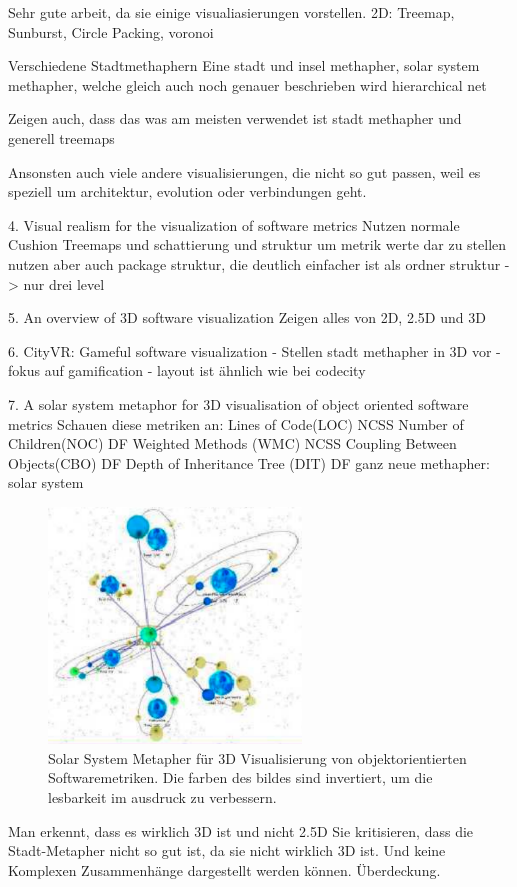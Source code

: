 Sehr gute arbeit, da sie einige visualiasierungen vorstellen.
2D: Treemap, Sunburst, Circle Packing, voronoi

Verschiedene Stadtmethaphern
Eine stadt und insel methapher,
solar system methapher, welche gleich auch noch genauer beschrieben wird
hierarchical net

Zeigen auch, dass das was am meisten verwendet ist stadt methapher und generell treemaps

Ansonsten auch viele andere visualisierungen, die nicht so gut passen, weil es speziell um architektur, evolution oder verbindungen geht.


4. Visual realism for the visualization of software metrics \cite{visRealism}
Nutzen normale Cushion Treemaps und schattierung und struktur um metrik werte dar zu stellen
nutzen aber auch package struktur, die deutlich einfacher ist als ordner struktur -> nur drei level

5. An overview of 3D software visualization \cite{overview3D}
Zeigen alles von 2D, 2.5D und 3D



6. CityVR: Gameful software visualization \cite{cityVR}
- Stellen stadt methapher in 3D vor
- fokus auf gamification
- layout ist ähnlich wie bei codecity

7. A solar system metaphor for 3D visualisation of object oriented software metrics \cite{solarSystem}
Schauen diese metriken an:
Lines of Code(LOC) NCSS
Number of Children(NOC) DF
Weighted Methods (WMC) NCSS
Coupling Between Objects(CBO) DF
Depth of Inheritance Tree (DIT) DF
ganz neue methapher: solar system

\begin{figure}
    \centering
    \includegraphics[width=0.6\textwidth]{images/literatur/solarSystemMethaphor.png}
    \caption{Solar System Metapher für 3D Visualisierung von objektorientierten Softwaremetriken. Die farben des bildes sind invertiert, um die lesbarkeit im ausdruck zu verbessern. \cite[4]{solarSystem}}
\end{figure}
Man erkennt, dass es wirklich 3D ist und nicht 2.5D
Sie kritisieren, dass die Stadt-Metapher nicht so gut ist, da sie nicht wirklich 3D ist. Und keine Komplexen Zusammenhänge dargestellt werden können. Überdeckung.

